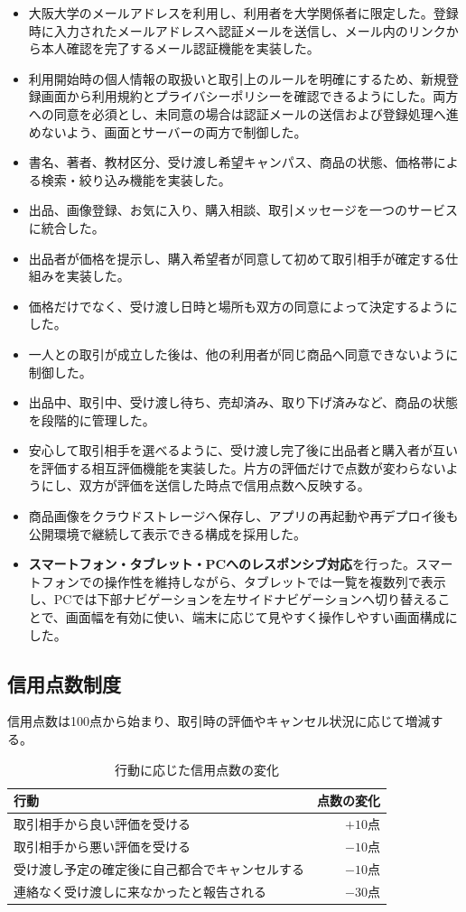 \documentclass[11pt,a4paper]{article}
\newcommand{\oustrong}[1]{\textbf{\color{darknavy}#1}}
\begin{document}
\begin{itemize}
  \item 大阪大学のメールアドレスを利用し、利用者を大学関係者に限定した。登録時に入力されたメールアドレスへ認証メールを送信し、メール内のリンクから本人確認を完了するメール認証機能を実装した。
  \item 利用開始時の個人情報の取扱いと取引上のルールを明確にするため、新規登録画面から利用規約とプライバシーポリシーを確認できるようにした。両方への同意を必須とし、未同意の場合は認証メールの送信および登録処理へ進めないよう、画面とサーバーの両方で制御した。
  \item 書名、著者、教材区分、受け渡し希望キャンパス、商品の状態、価格帯による検索・絞り込み機能を実装した。
  \item 出品、画像登録、お気に入り、購入相談、取引メッセージを一つのサービスに統合した。
  \item 出品者が価格を提示し、購入希望者が同意して初めて取引相手が確定する仕組みを実装した。
  \item 価格だけでなく、受け渡し日時と場所も双方の同意によって決定するようにした。
  \item 一人との取引が成立した後は、他の利用者が同じ商品へ同意できないように制御した。
  \item 出品中、取引中、受け渡し待ち、売却済み、取り下げ済みなど、商品の状態を段階的に管理した。
  \item 安心して取引相手を選べるように、受け渡し完了後に出品者と購入者が互いを評価する相互評価機能を実装した。片方の評価だけで点数が変わらないようにし、双方が評価を送信した時点で信用点数へ反映する。
  \item 商品画像をクラウドストレージへ保存し、アプリの再起動や再デプロイ後も公開環境で継続して表示できる構成を採用した。
  \item \oustrong{スマートフォン・タブレット・PCへのレスポンシブ対応}を行った。スマートフォンでの操作性を維持しながら、タブレットでは一覧を複数列で表示し、PCでは下部ナビゲーションを左サイドナビゲーションへ切り替えることで、画面幅を有効に使い、端末に応じて見やすく操作しやすい画面構成にした。
\end{itemize}

\subsection{信用点数制度}

信用点数は100点から始まり、取引時の評価やキャンセル状況に応じて増減する。

\begin{table}[htbp]
  \centering
  \caption{行動に応じた信用点数の変化}
  \begin{tabularx}{0.86\textwidth}{Xr}
    \toprule
    行動 & 点数の変化\\
    \midrule
    取引相手から良い評価を受ける & $+10$点\\
    取引相手から悪い評価を受ける & $-10$点\\
    受け渡し予定の確定後に自己都合でキャンセルする & $-10$点\\
    連絡なく受け渡しに来なかったと報告される & $-30$点\\
    \bottomrule
  \end{tabularx}
\end{table}
\end{document}
